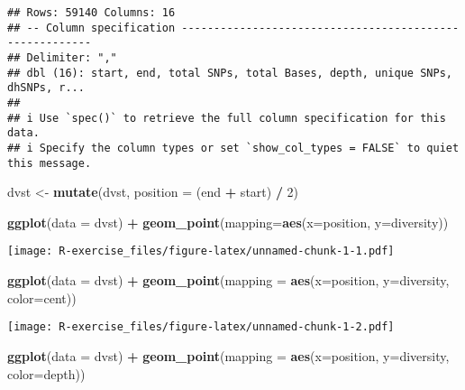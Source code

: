\documentclass[
]{article}
\newenvironment{Shaded}{\begin{snugshade}}{\end{snugshade}}
\newcommand{\AttributeTok}[1]{\textcolor[rgb]{0.13,0.29,0.53}{#1}}
\newcommand{\DecValTok}[1]{\textcolor[rgb]{0.00,0.00,0.81}{#1}}
\newcommand{\FunctionTok}[1]{\textcolor[rgb]{0.13,0.29,0.53}{\textbf{#1}}}
\newcommand{\NormalTok}[1]{#1}
\newcommand{\OtherTok}[1]{\textcolor[rgb]{0.56,0.35,0.01}{#1}}
\newcommand{\SpecialCharTok}[1]{\textcolor[rgb]{0.81,0.36,0.00}{\textbf{#1}}}
\begin{document}
\begin{verbatim}
## Rows: 59140 Columns: 16
## -- Column specification --------------------------------------------------------
## Delimiter: ","
## dbl (16): start, end, total SNPs, total Bases, depth, unique SNPs, dhSNPs, r...
## 
## i Use `spec()` to retrieve the full column specification for this data.
## i Specify the column types or set `show_col_types = FALSE` to quiet this message.
\end{verbatim}

\begin{Shaded}
\begin{Highlighting}[]
\NormalTok{dvst }\OtherTok{\textless{}{-}} \FunctionTok{mutate}\NormalTok{(dvst, }\AttributeTok{position =}\NormalTok{ (end }\SpecialCharTok{+}\NormalTok{ start) }\SpecialCharTok{/} \DecValTok{2}\NormalTok{)}

\FunctionTok{ggplot}\NormalTok{(}\AttributeTok{data =}\NormalTok{ dvst) }\SpecialCharTok{+} \FunctionTok{geom\_point}\NormalTok{(}\AttributeTok{mapping=}\FunctionTok{aes}\NormalTok{(}\AttributeTok{x=}\NormalTok{position, }\AttributeTok{y=}\NormalTok{diversity))}
\end{Highlighting}
\end{Shaded}

\texttt{[image: R-exercise\_files/figure-latex/unnamed-chunk-1-1.pdf]}

\begin{Shaded}
\begin{Highlighting}[]
\FunctionTok{ggplot}\NormalTok{(}\AttributeTok{data =}\NormalTok{ dvst) }\SpecialCharTok{+} \FunctionTok{geom\_point}\NormalTok{(}\AttributeTok{mapping =} \FunctionTok{aes}\NormalTok{(}\AttributeTok{x=}\NormalTok{position, }\AttributeTok{y=}\NormalTok{diversity, }\AttributeTok{color=}\NormalTok{cent))}
\end{Highlighting}
\end{Shaded}

\texttt{[image: R-exercise\_files/figure-latex/unnamed-chunk-1-2.pdf]}

\begin{Shaded}
\begin{Highlighting}[]
\FunctionTok{ggplot}\NormalTok{(}\AttributeTok{data =}\NormalTok{ dvst) }\SpecialCharTok{+} \FunctionTok{geom\_point}\NormalTok{(}\AttributeTok{mapping =} \FunctionTok{aes}\NormalTok{(}\AttributeTok{x=}\NormalTok{position, }\AttributeTok{y=}\NormalTok{diversity, }\AttributeTok{color=}\NormalTok{depth))}
\end{Highlighting}
\end{Shaded}
\end{document}
